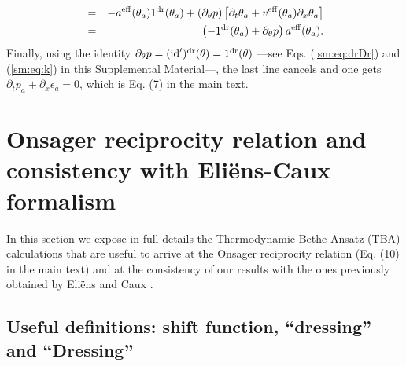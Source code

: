 \documentclass[twocolumn,amsfonts,showpacs,superscriptaddress]{revtex4-1}
\begin{document}
\begin{widetext}
\begin{eqnarray*}
	&=& - a^{\rm eff} (\theta_a) 1^{\rm dr}  (\theta_a)  + (\partial_{\theta} p) \left[ \partial_t \theta_a + v^{\rm eff} (\theta_a) \partial_x \theta_a  \right] \\
	&=&  \left(  - 1^{\rm dr}  (\theta_a)  + \partial_{\theta} p \right) a^{\rm eff} (\theta_a)  .
\end{eqnarray*}
Finally, using the identity $\partial_{\theta} p = ({\rm id}')^{\rm dr} (\theta) = 1^{\rm dr} (\theta) $ ---see Eqs. (\ref{sm:eq:drDr}) and (\ref{sm:eq:k}) in this Supplemental Material---, the last line cancels and one gets $\partial_t p_a + \partial_x \epsilon_a = 0$, which is Eq. (7) in the main text.






\section{Onsager reciprocity relation and consistency with Eli\"ens-Caux formalism}


In this section we expose in full details the Thermodynamic Bethe Ansatz (TBA) calculations that are useful to arrive at the Onsager reciprocity relation (Eq. (10) in the main text) and at the consistency of our results with the ones previously obtained by Eli\"ens and Caux \cite{eliens2016general,eliens2017quantum}.



\subsection{Useful definitions: shift function, ``dressing'' and ``Dressing''}


\end{widetext}
\end{document}
